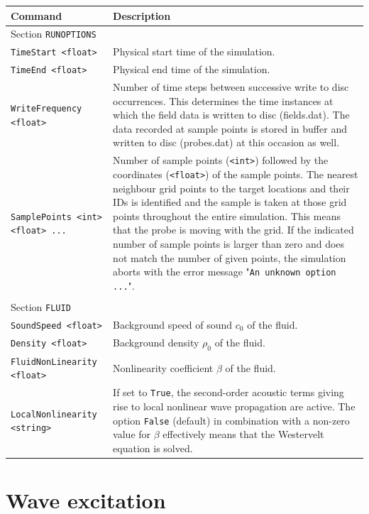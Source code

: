 \noindent
\begin{longtable}{p{} p{}}
\textbf{Command} & \textbf{Description}
\vspace{1mm} \\
\hline Section {\tt RUNOPTIONS} &\\ \hline
{\tt TimeStart <float>} & Physical start time of the simulation. \\
{\tt TimeEnd <float>} & Physical end time of the simulation. \\{\tt WriteFrequency <float>} & Number of time steps between successive write to disc occurrences. This determines the time instances at which the field data is written to disc (fields.dat). The data recorded at sample points is stored in buffer and written to disc (probes.dat) at this occasion as well. \\
{\tt SamplePoints <int> <float> ...} & Number of sample points ({\tt <int>}) followed by the coordinates ({\tt <float>}) of the sample points. The nearest neighbour grid points to the target locations and their IDs is identified and the sample is taken at those grid points throughout the entire simulation. This means that the probe is moving with the grid. If the indicated number of sample points is larger than zero and does not match the number of given points, the simulation aborts with the error message "{\tt An unknown option ...}". \\
\\
\hline Section {\tt FLUID} &\\ \hline
{\tt SoundSpeed <float>} & Background speed of sound $c_0$ of the fluid. \\
{\tt Density <float>} & Background density $\rho_0$ of the fluid. \\
{\tt FluidNonLinearity <float>} & Nonlinearity coefficient $\beta$ of the fluid. \\
{\tt LocalNonlinearity <string>} & If set to {\tt True}, the second-order acoustic terms giving rise to local nonlinear wave propagation are active. The option {\tt False} (default) in combination with a non-zero value for $\beta$ effectively means that the Westervelt equation is solved. \\
 \hline
\end{longtable} \vspace{1em}


\section{Wave excitation}
\label{sec:Wave excitation}

